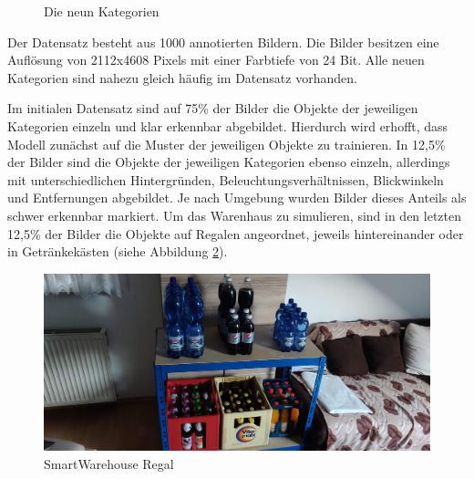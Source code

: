\begin{figure}[htb]
	\caption{Die neun Kategorien}
	\label{categories}
\end{figure}

Der Datensatz besteht aus 1000 annotierten Bildern. Die Bilder besitzen eine Auflösung von 2112x4608 Pixels mit einer Farbtiefe von 24 Bit. Alle neuen Kategorien sind nahezu gleich häufig im Datensatz vorhanden. 

Im initialen Datensatz sind auf 75\% der Bilder die Objekte der jeweiligen Kategorien einzeln und klar erkennbar abgebildet. Hierdurch wird erhofft, dass Modell zunächst auf die Muster der jeweiligen Objekte zu trainieren. In 12,5\% der Bilder sind die Objekte der jeweiligen Kategorien ebenso einzeln, allerdings mit unterschiedlichen Hintergründen, Beleuchtungsverhältnissen, Blickwinkeln und Entfernungen abgebildet. Je nach Umgebung wurden Bilder dieses Anteils als schwer erkennbar markiert. Um das Warenhaus zu simulieren, sind in den letzten 12,5\% der Bilder die Objekte auf Regalen angeordnet, jeweils hintereinander oder in Getränkekästen (siehe Abbildung \ref{regal}). 

\begin{figure}[ht]
	\begin{center}
		\includegraphics[width=16cm]{Bilder/regal.jpg} 
		\caption[Smart Warehouse Regal]{SmartWarehouse Regal}
		\label{regal}
	\end{center}
\end{figure}
